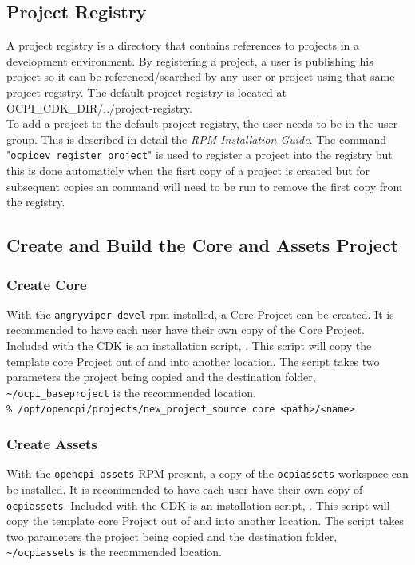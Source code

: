 \subsection{Project Registry}
A project registry is a directory that contains references to projects in a development environment. By registering a project, a user is publishing his project so it can be referenced/searched by any user or project using that same project registry. The default project registry is located at OCPI\_CDK\_DIR/../project-registry. \\

To add a project to the default project registry, the user needs to be in the  user group.  This is described in detail the \textit{RPM Installation Guide}.  The command "\verb+ocpidev register project+" is used to register a project into the registry but this is done automaticly when the fisrt copy of a project is created but for subsequent copies an  command will need to be run to remove the first copy from the registry.  

\subsection{Create and Build the Core and Assets Project}
\subsubsection{Create Core}
With the \texttt{angryviper-devel} rpm installed, a Core Project can be created. It is recommended to have each user have their own copy of the Core Project. Included with the CDK is an installation script,  . This script will copy the template core Project out of  and into another location. The script takes two parameters the project being copied and the destination folder, \verb+~/ocpi_baseproject+ is the recommended location.\\

\verb+% /opt/opencpi/projects/new_project_source core <path>/<name>+

\subsubsection{Create Assets}
With the \texttt{opencpi-assets} RPM present, a copy of the \texttt{ocpiassets} workspace can be installed. It is recommended to have each user have their own copy of \texttt{ocpiassets}. Included with the CDK is an installation script,  . This script will copy the template core Project out of  and into another location. The script takes two parameters the project being copied and the destination folder, \verb+~/ocpiassets+ is the recommended location.\\

